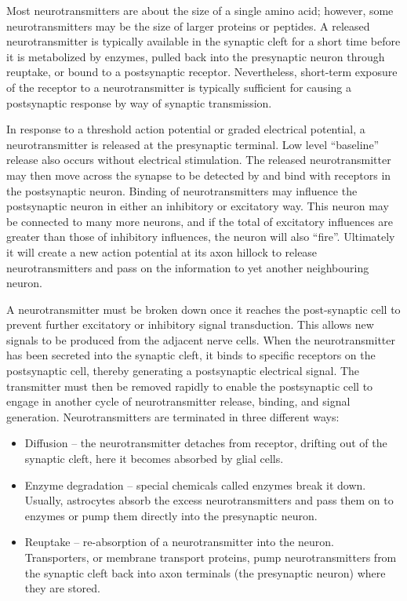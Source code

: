 Most neurotransmitters are about the size of a single amino acid; however, some neurotransmitters may be the size of larger proteins or peptides. A released neurotransmitter is typically available in the synaptic cleft for a short time before it is metabolized by enzymes, pulled back into the presynaptic neuron through reuptake, or bound to a postsynaptic receptor. Nevertheless, short-term exposure of the receptor to a neurotransmitter is typically sufficient for causing a postsynaptic response by way of synaptic transmission.

In response to a threshold action potential or graded electrical potential, a neurotransmitter is released at the presynaptic terminal. Low level ``baseline'' release also occurs without electrical stimulation. The released neurotransmitter may then move across the synapse to be detected by and bind with receptors in the postsynaptic neuron. Binding of neurotransmitters may influence the postsynaptic neuron in either an inhibitory or excitatory way. This neuron may be connected to many more neurons, and if the total of excitatory influences are greater than those of inhibitory influences, the neuron will also ``fire''. Ultimately it will create a new action potential at its axon hillock to release neurotransmitters and pass on the information to yet another neighbouring neuron.

A neurotransmitter must be broken down once it reaches the post-synaptic cell to prevent further excitatory or inhibitory signal transduction. This allows new signals to be produced from the adjacent nerve cells. When the neurotransmitter has been secreted into the synaptic cleft, it binds to specific receptors on the postsynaptic cell, thereby generating a postsynaptic electrical signal. The transmitter must then be removed rapidly to enable the postsynaptic cell to engage in another cycle of neurotransmitter release, binding, and signal generation. Neurotransmitters are terminated in three different ways:

\begin{itemize}
\tightlist
\item
  Diffusion -- the neurotransmitter detaches from receptor, drifting out of the synaptic cleft, here it becomes absorbed by glial cells.
\item
  Enzyme degradation -- special chemicals called enzymes break it down. Usually, astrocytes absorb the excess neurotransmitters and pass them on to enzymes or pump them directly into the presynaptic neuron.
\item
  Reuptake -- re-absorption of a neurotransmitter into the neuron. Transporters, or membrane transport proteins, pump neurotransmitters from the synaptic cleft back into axon terminals (the presynaptic neuron) where they are stored.
\end{itemize}

